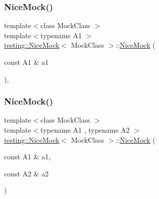 \mbox{\label{classtesting_1_1_nice_mock_a2d6b9cb9d929d1af4532b69c7ef19df6}} 
\subsubsection{\texorpdfstring{Nice\+Mock()}{NiceMock()}\hspace{0.1cm}{\footnotesize\ttfamily [2/11]}}
{\footnotesize\ttfamily template$<$class Mock\+Class $>$ \\
template$<$typename A1 $>$ \\
\hyperlink{classtesting_1_1_nice_mock}{testing\+::\+Nice\+Mock}$<$ Mock\+Class $>$\+::\hyperlink{classtesting_1_1_nice_mock}{Nice\+Mock} (\begin{DoxyParamCaption}\item[{const A1 \&}]{a1 }\end{DoxyParamCaption})\hspace{0.3cm}{\ttfamily [inline]}, {\ttfamily [explicit]}}

\mbox{\label{classtesting_1_1_nice_mock_a150837476e88f52772c8f85180b889a1}} 
\subsubsection{\texorpdfstring{Nice\+Mock()}{NiceMock()}\hspace{0.1cm}{\footnotesize\ttfamily [3/11]}}
{\footnotesize\ttfamily template$<$class Mock\+Class $>$ \\
template$<$typename A1 , typename A2 $>$ \\
\hyperlink{classtesting_1_1_nice_mock}{testing\+::\+Nice\+Mock}$<$ Mock\+Class $>$\+::\hyperlink{classtesting_1_1_nice_mock}{Nice\+Mock} (\begin{DoxyParamCaption}\item[{const A1 \&}]{a1,  }\item[{const A2 \&}]{a2 }\end{DoxyParamCaption})\hspace{0.3cm}{\ttfamily [inline]}}

\mbox{\label{classtesting_1_1_nice_mock_a0b91bd74b497626bb81d07c3d4b59d22}} 
